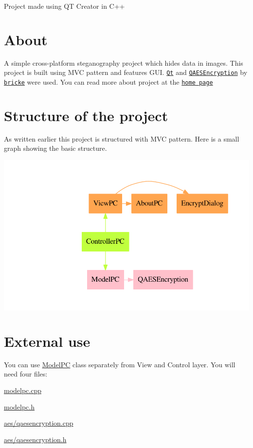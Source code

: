 Project made using QT Creator in C++\hypertarget{index_about}{}\section{About}\label{index_about}
A simple cross-\/platform steganography project which hides data in images. This project is built using M\+VC pattern and features G\+UI. \href{https://qt.io}{\tt Qt} and \href{https://github.com/bricke/Qt-AES}{\tt Q\+A\+E\+S\+Encryption} by \href{https://github.com/bricke}{\tt bricke} were used. You can read more about project at the \href{waleko.github.io/PictureCrypt}{\tt home page}\hypertarget{index_structure}{}\section{Structure of the project}\label{index_structure}
As written earlier this project is structured with M\+VC pattern. Here is a small graph showing the basic structure. 
\begin{DoxyImageNoCaption}
  \mbox{\includegraphics[width=\textwidth,height=\textheight/2,keepaspectratio=true]{dot_structure}}
\end{DoxyImageNoCaption}
\hypertarget{index_ext-use}{}\section{External use}\label{index_ext-use}
You can use \hyperlink{class_model_p_c}{Model\+PC} class separately from View and Control layer. You will need four files\+:


\begin{DoxyItemize}
\item \hyperlink{modelpc_8cpp}{modelpc.\+cpp} 
\item \hyperlink{modelpc_8h}{modelpc.\+h} 
\item \hyperlink{qaesencryption_8cpp}{aes/qaesencryption.\+cpp} 
\item \hyperlink{qaesencryption_8h}{aes/qaesencryption.\+h} 
\end{DoxyItemize}

